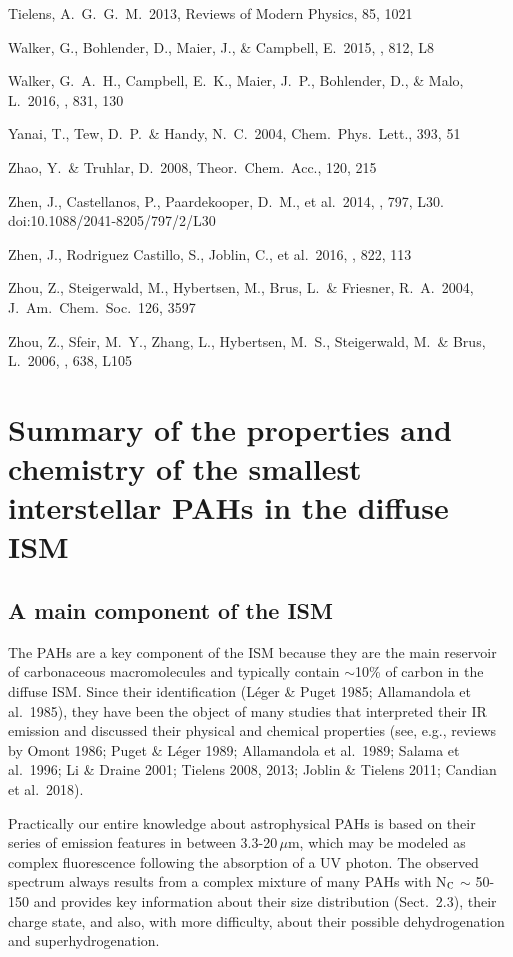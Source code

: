 \documentclass{aa}
\begin{document}
Tielens, A.~G.~G.~M.\ 2013, Reviews of Modern Physics, 85, 1021


Walker, G., Bohlender, D., Maier, J., \& Campbell, E.\ 2015, \apjl, 812, L8  

 Walker, G.~A.~H., Campbell, E.~K., Maier, J.~P., Bohlender, D., \& Malo, 
L.\ 2016, \apj, 831, 130 

Yanai, T., Tew, D.~P.\ \& Handy, N.~C.\ 2004, Chem.\ Phys.\ Lett., 393, 51

Zhao, Y.\ \& Truhlar, D.\ 2008, Theor.\ Chem.\ Acc., 120, 215

Zhen, J., Castellanos, P., Paardekooper, D.~M., et al.\ 2014, \apjl, 797, 
L30. doi:10.1088/2041-8205/797/2/L30

Zhen, J., Rodriguez Castillo, S., Joblin, C., et al.\ 2016, \apj, 822, 113 

Zhou, Z., Steigerwald, M., Hybertsen, M., Brus, L.\ \& Friesner, R.~A.\ 2004, J.\ Am.\ Chem.\ Soc.\ 126, 3597

Zhou, Z., Sfeir, M.~Y., Zhang, L., Hybertsen, M.~S., Steigerwald, M.\ \&  
Brus, L.\ 2006, \apjl, 638, L105 

\appendix  {}

\section{Summary of the properties and chemistry of the smallest interstellar 
PAHs in the diffuse ISM}

\subsection{A main component of the ISM}

The PAHs are a key component of the ISM because they are the main reservoir of carbonaceous macromolecules and typically contain $\sim$10\% of carbon in the diffuse ISM. Since their identification  (L\'eger \& Puget 1985; Allamandola et al.\ 1985), they have been the object of many studies that  interpreted  their IR emission and discussed their physical and chemical properties (see, e.g., reviews by Omont 1986; Puget \& L\'eger 1989; Allamandola et al.\ 1989;  Salama et al.\ 1996; Li \& Draine 2001; Tielens 2008, 2013; Joblin \& Tielens 2011; Candian et al.\ 2018).

Practically our entire knowledge about astrophysical PAHs  is based on their series of emission features in between 3.3-20\,$\mu$m, which may be modeled as complex fluorescence following the absorption of a UV photon. The observed spectrum always results from a complex mixture of many PAHs with N$_{\rm C}$ $\sim$ 50-150 and provides key information about their size distribution (Sect.\ 2.3),  their charge state, and also, with more difficulty, about their possible dehydrogenation and superhydrogenation. 
\end{document}
